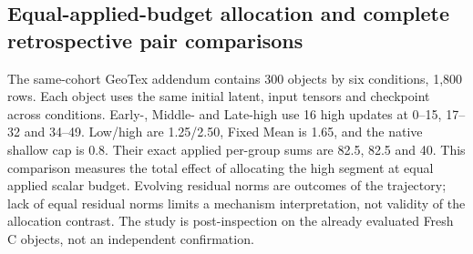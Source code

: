 \documentclass[11pt]{article}
\begin{document}
\subsection*{Equal-applied-budget allocation and complete retrospective pair comparisons}
The same-cohort GeoTex addendum contains 300 objects by six conditions, 1,800 rows. Each object uses the same initial latent, input tensors and checkpoint across conditions. Early-, Middle- and Late-high use 16 high updates at 0--15, 17--32 and 34--49. Low/high are 1.25/2.50, Fixed Mean is 1.65, and the native shallow cap is 0.8. Their exact applied per-group sums are 82.5, 82.5 and 40. This comparison measures the total effect of allocating the high segment at equal applied scalar budget. Evolving residual norms are outcomes of the trajectory; lack of equal residual norms limits a mechanism interpretation, not validity of the allocation contrast. The study is post-inspection on the already evaluated Fresh C objects, not an independent confirmation.
\end{document}

